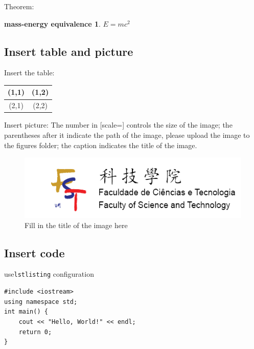 \documentclass[12pt,hyperref,a4paper,UTF8]{article}
\begin{document}
Theorem:
\newtheorem{mass-energy equivalence}{mass-energy equivalence}[section]
\begin{mass-energy equivalence} \label{thm:1}
$E = mc^2$
\end{mass-energy equivalence}

\subsection{Insert table and picture}
Insert the table:
\begin{table}[h]
    \begin{tabular}{|c|c|}%
        \hline  %
        (1,1) & (1,2) \\
        \hline  %
        (2,1) & (2,2) \\
        \hline %
    \end{tabular}
\end{table}

Insert picture:
The number in [scale=] controls the size of the image; the parentheses after it indicate the path of the image, please upload the image to the figures folder; the caption indicates the title of the image.
\begin{figure}[h]
    \centering
    \includegraphics[scale=0.1]{figures/FST-logo.png}
    \caption{Fill in the title of the image here}
\end{figure}

\subsection{Insert code}
use\verb|lstlisting| configuration
\begin{lstlisting}[style=CPP, title="c++ code"]
#include <iostream>
using namespace std;
int main() {
    cout << "Hello, World!" << endl;
    return 0;
}

\end{lstlisting}
\end{document}
